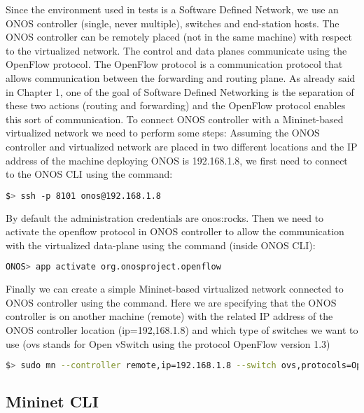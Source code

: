 \documentclass[a4paper,10pt]{memoir}
\begin{document}
Since the environment used in tests is a Software Defined Network, we use an ONOS controller (single, never multiple), switches and end-station hosts. The ONOS controller can be remotely placed (not in the same machine) with respect to the virtualized network. The control and data planes communicate using the OpenFlow protocol. The OpenFlow protocol
is a communication protocol that allows communication between the forwarding and routing plane. As already said in Chapter 1, one of the goal of Software Defined Networking is the separation of these two actions (routing and forwarding) and the OpenFlow protocol enables this sort of communication. To connect ONOS controller with a Mininet-based virtualized network we need to perform some steps: Assuming the ONOS controller and virtualized network are placed in two different locations and the IP address of the machine deploying ONOS is 192.168.1.8, we first need to connect to the ONOS CLI using the command:
\begin{lstlisting}[language=bash]
  $> ssh -p 8101 onos@192.168.1.8
\end{lstlisting}
By default the administration credentials are onos:rocks. Then we need to activate the openflow protocol in ONOS controller to allow the communication with the virtualized data-plane using the command (inside ONOS CLI):
\begin{lstlisting}[language=bash]
  ONOS> app activate org.onosproject.openflow
\end{lstlisting}

Finally we can create a simple Mininet-based virtualized network connected to ONOS controller using the command. Here we are specifying that the ONOS controller is on another machine (remote) with the related IP address of the ONOS controller location (ip=192,168.1.8) and which type of switches we want to use (ovs stands for Open vSwitch using the protocol OpenFlow version 1.3)
\begin{lstlisting}[language=bash]
  $> sudo mn --controller remote,ip=192.168.1.8 --switch ovs,protocols=OpenFlow13
\end{lstlisting}
\medskip

\subsection{Mininet CLI}
\end{document}
